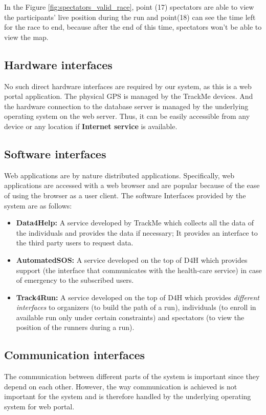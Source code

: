 \documentclass[a4paper, hidelinks, 12pt]{report}
\begin{document}
	In the Figure \ref{fig:spectators_valid_race}, point (17) spectators are able to view the participants' live position during the run and point(18) can see the time left for the race to end, because after the end of this time, spectators won't be able to view the map. 

	\subsection{Hardware interfaces}
	No such direct hardware interfaces are required by our system, as this is a web portal application. The physical GPS is managed by the TrackMe devices. And the hardware connection to the database server is managed by the underlying operating system on the web server. Thus, it can be easily accessible from any device or any location if \textbf{Internet service} is available.
	
	\subsection{Software interfaces}
	Web applications are by nature distributed applications. Specifically, web applications are accessed with a web browser and are popular because of the ease of using the browser as a user client. The software Interfaces provided by the system are as follows:\\
	
	\begin{itemize}
		\item{} \textbf{Data4Help:} A service developed by TrackMe which collects all the data of the individuals and provides the data if necessary; It provides an interface to the third party users to request data.
		\item{} \textbf{AutomatedSOS:} A service developed on the top of D4H which provides support (the interface that communicates with the health-care service) in case of emergency to the subscribed users.
		\item{} \textbf{Track4Run:} A service developed on the top of D4H  which provides \textit{different interfaces} to organizers (to build the path of a run), individuals (to enroll in available run only under certain constraints) and spectators (to view the position of the runners during a run).
	\end{itemize}
	
	\subsection{Communication interfaces}
	The communication between different parts of the system is important since they depend on each other. However, the way communication is achieved is not important for the system and is therefore handled by the underlying operating system for web portal.
	
\end{document}
